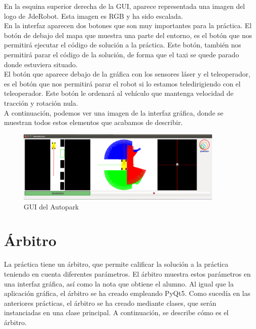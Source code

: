 En la esquina superior derecha de la GUI, aparece representada una imagen del logo de JdeRobot. Esta imagen es RGB y ha sido escalada.\\

En la interfaz aparecen dos botones que son muy importantes para la práctica. El botón de debajo del mapa que muestra una parte del entorno, es el botón que nos permitirá ejecutar el código de solución a la práctica. Este botón, también nos permitirá parar el código de la solución, de forma que el taxi se quede parado donde estuviera situado.\\

El botón que aparece debajo de la gráfica con los sensores láser y el teleoperador, es el botón que nos permitirá parar el robot si lo estamos teledirigiendo con el teleoperador. Este botón le ordenará al vehículo que mantenga velocidad de tracción y rotación nula.\\

A continuación, podemos ver una imagen de la interfaz gráfica, donde se muestran todos estos elementos que acabamos de describir.\\

\begin{figure}[H]
  \begin{center}
    \includegraphics[width=0.9\textwidth]{figures/Autopark/GUI_Autopark.png}
		\caption{GUI del Autopark}
		\label{fig.GUI_Autopark}
		\end{center}
\end{figure}

\section{Árbitro}
La práctica tiene un árbitro, que permite calificar la solución a la práctica teniendo en cuenta diferentes parámetros. El árbitro muestra estos parámetros en una interfaz gráfica, así como la nota que obtiene el alumno. Al igual que la aplicación gráfica, el árbitro se ha creado empleando PyQt5. Como sucedía en las anteriores prácticas, el árbitro se ha creado mediante clases, que serán instanciadas en una clase principal. A continuación, se describe cómo es el árbitro.\\

